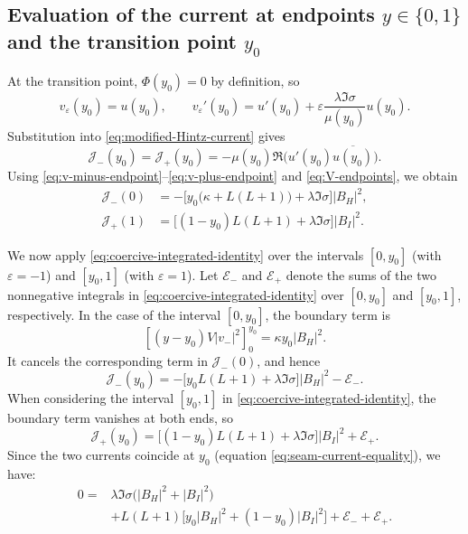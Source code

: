 \documentclass[11pt]{article}
\numberwithin{equation}{section}
\begin{document}
	\subsection{Evaluation of the current at endpoints \texorpdfstring{$y\in\{0,1\}$}{y = 0, 1} and the transition point \texorpdfstring{$y_0$}{y0}}
	
	At the transition point, $\Phi(y_0)=0$ by definition, so
	\begin{equation}
		v_\varepsilon(y_0)=u(y_0),\qquad
		v_\varepsilon'(y_0)
		=u'(y_0)+\varepsilon\frac{\lambda\Im\sigma}{\mu(y_0)}u(y_0).
		\label{eq:v-derivative-seam}
	\end{equation}
	Substitution into \eqref{eq:modified-Hintz-current} gives
	\begin{equation}
		\mathcal J_-(y_0)=\mathcal J_+(y_0)
		=-\mu(y_0)\Re\bigl(u'(y_0)\overline{u(y_0)}\bigr).
		\label{eq:seam-current-equality}
	\end{equation}
	Using \eqref{eq:v-minus-endpoint}--\eqref{eq:v-plus-endpoint} and
	\eqref{eq:V-endpoints}, we obtain
	\begin{equation}
		\begin{aligned}
			\mathcal J_-(0)
			&=-\bigl[y_0\bigl(\kappa+L(L+1)\bigr)
			+\lambda\Im\sigma\bigr]|B_H|^2,\\
			\mathcal J_+(1)
			&=\bigl[(1-y_0)L(L+1)+\lambda\Im\sigma\bigr]|B_I|^2.
		\end{aligned}
		\label{eq:endpoint-currents}
	\end{equation}
	
	We now apply \eqref{eq:coercive-integrated-identity} over the intervals $[0, y_0]$ (with $\varepsilon=-1$) and $[y_0, 1]$ (with $\varepsilon=1$). Let $\mathcal E_-$ and $\mathcal E_+$ denote the sums of the two
	nonnegative integrals in \eqref{eq:coercive-integrated-identity} over
	$[0,y_0]$ and $[y_0,1]$, respectively.
	In the case of the interval $[0, y_0]$, the boundary term is
	\[
	\left[(y-y_0)V|v_-|^2\right]_{0}^{y_0}
	=\kappa y_0|B_H|^2.
	\]
	It cancels the corresponding term in $\mathcal J_-(0)$, and hence
	\begin{equation}
		\mathcal J_-(y_0)
		=-\bigl[y_0L(L+1)+\lambda\Im\sigma\bigr]|B_H|^2-\mathcal E_-.
		\label{eq:left-seam-sign}
	\end{equation}
	When considering the interval $[y_0, 1]$ in \eqref{eq:coercive-integrated-identity}, the boundary term vanishes at both ends, so
	\begin{equation}
		\mathcal J_+(y_0)
		=\bigl[(1-y_0)L(L+1)+\lambda\Im\sigma\bigr]|B_I|^2+\mathcal E_+.
		\label{eq:right-seam-sign}
	\end{equation}
	Since the two currents coincide at $y_0$ (equation \eqref{eq:seam-current-equality}), we have:
	\begin{equation}
		\begin{aligned}
			0={}&\lambda\Im\sigma\bigl(|B_H|^2+|B_I|^2\bigr)\\
			&+L(L+1)\bigl[y_0|B_H|^2+(1-y_0)|B_I|^2\bigr]
			+\mathcal E_-+\mathcal E_+.
		\end{aligned}
		\label{eq:master-mode-identity}
	\end{equation}
	
\end{document}
